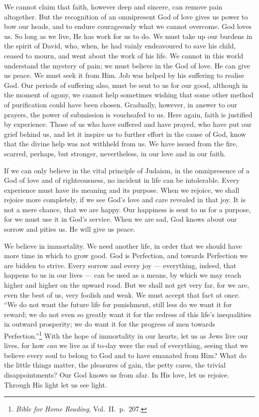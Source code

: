 We cannot claim that faith, however deep
and sincere, can remove pain altogether.
But the recognition of an omnipresent God
of love gives us power to bow our heads, and
to endure courageously what we cannot
overcome. God loves us. So long as we
live, He has work for us to do. We must
take up our burdens in the spirit of David,
who, when, he had vainly endeavoured to
save his child, ceased to mourn, and went
about the work of his life. We cannot in this
world understand the mystery of pain; we
must believe in the God of love. He can
give us peace. We must seek it from Him.
Job was helped by his suffering to realise
God. Our periods of suffering also, must
be sent to us for our good, although in the
moment of agony, we cannot help sometimes
wishing that some other method of
purification could have been chosen.
Gradually, however, in answer to our
prayers, the power of submission is
vouchsafed to us. Here again, faith is
justified by experience. Those of us who
have suffered and have prayed, who have
put our grief behind us, and let it inspire us
to further effort in the cause of God, know
that the divine help was not withheld from
us. We have issued from the fire, scarred,
perhaps, but stronger, nevertheless, in our
love and in our faith.

If we can only believe in the vital principle
of Judaism, in the omnipresence of a God
of love and of righteousness, no incident in
life can be intolerable. Every experience
must have its meaning and its purpose.
When we rejoice, we shall rejoice more
completely, if we see God’s love and care
revealed in that joy. It is not a mere
chance, that we are happy. Our happiness
is sent to us for a purpose, for we must use
it in God’s service. When we are sad, God
knows about our sorrow and pities us. He
will give us peace.

We believe in immortality. We need
another life, in order that we should have
more time in which to grow good. God is
Perfection, and towards Perfection we are
bidden to strive. Every sorrow and every
joy — everything, indeed, that happens to us
in our lives — can be used as a means, by
which we may reach higher and higher on
the upward road. But we shall not get
very far, for we are, even the best of us,
very foolish and weak. We must accept
that fact at once. “We do not want the
future life for punishment, still less do we
want it for reward; we do not even so
greatly want it for the redress of this life’s
inequalities in outward prosperity; we do
want it for the progress of men towards
Perfection.”\footnote{\textsl{Bible for
  Home Reading}, Vol.\ II.\ p.\ 207.} With
the hope of immortality in
our hearts, let us as Jews live our lives, for
how \textsl{can} we live as if to-day were the end
of everything, seeing that we believe every
soul to belong to God and to have emanated
from Him? What do the little things
matter, the pleasures of gain, the petty
cares, the trivial disappointments? Our
God knows us from afar. In His love, let
us rejoice. Through His light let us see
light.
 

